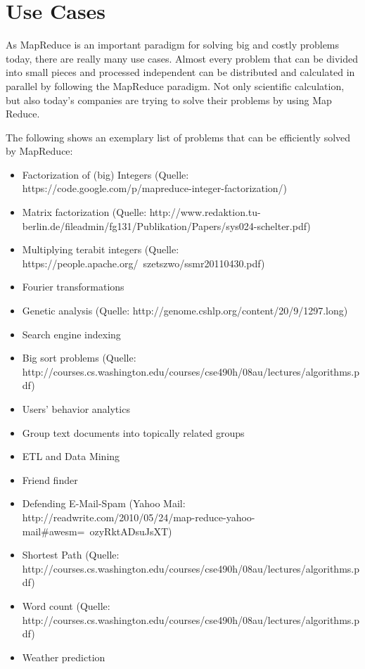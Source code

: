 \section{Use Cases}
As MapReduce is an important paradigm for solving big and costly problems today, there are really
many use cases. Almost every problem that can be divided into small pieces and processed independent
can be distributed and calculated in parallel by following the MapReduce paradigm. Not only
scientific calculation, but also today’s companies are trying to solve their problems by using Map
Reduce.

The following shows an exemplary list of problems that can be efficiently solved by MapReduce:
\begin{singlespacing}
	\begin{itemize}
	  \item Factorization of (big) Integers (Quelle: https://code.google.com/p/mapreduce-integer-factorization/) 
	  \item Matrix factorization (Quelle: http://www.redaktion.tu-berlin.de/fileadmin/fg131/Publikation/Papers/sys024-schelter.pdf) 
	  \item Multiplying terabit integers (Quelle: https://people.apache.org/~szetszwo/ssmr20110430.pdf)
	  \item Fourier transformations
	  \item Genetic analysis (Quelle: http://genome.cshlp.org/content/20/9/1297.long) 
	  \item Search engine indexing
	  \item Big sort problems (Quelle: http://courses.cs.washington.edu/courses/cse490h/08au/lectures/algorithms.pdf) 
	  \item Users' behavior analytics
	  \item Group text documents into topically related groups
	  \item ETL and Data Mining
	  \item Friend finder
	  \item Defending E-Mail-Spam (Yahoo Mail: http://readwrite.com/2010/05/24/map-reduce-yahoo-mail#awesm=~ozyRktADsuJsXT) 
	  \item Shortest Path (Quelle: http://courses.cs.washington.edu/courses/cse490h/08au/lectures/algorithms.pdf)  
	  \item Word count (Quelle: http://courses.cs.washington.edu/courses/cse490h/08au/lectures/algorithms.pdf) 
	  \item Weather prediction
	\end{itemize}
\end{singlespacing}

